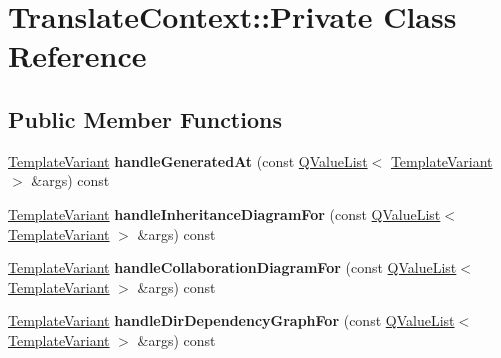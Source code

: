 \hypertarget{class_translate_context_1_1_private}{}\section{Translate\+Context\+::Private Class Reference}
\label{class_translate_context_1_1_private}
\subsection*{Public Member Functions}
\begin{DoxyCompactItemize}
\item 
\mbox{\label{class_translate_context_1_1_private_a4c2491bb58adb05eb7e8b21cfe10e8bc}} 
\mbox{\hyperlink{class_template_variant}{Template\+Variant}} {\bfseries handle\+Generated\+At} (const \mbox{\hyperlink{class_q_value_list}{Q\+Value\+List}}$<$ \mbox{\hyperlink{class_template_variant}{Template\+Variant}} $>$ \&args) const
\item 
\mbox{\label{class_translate_context_1_1_private_a7d13bd557b1e15a8d7444ad002c48625}} 
\mbox{\hyperlink{class_template_variant}{Template\+Variant}} {\bfseries handle\+Inheritance\+Diagram\+For} (const \mbox{\hyperlink{class_q_value_list}{Q\+Value\+List}}$<$ \mbox{\hyperlink{class_template_variant}{Template\+Variant}} $>$ \&args) const
\item 
\mbox{\label{class_translate_context_1_1_private_a0ff2da7fb5ded1dcc554248444b9d4ce}} 
\mbox{\hyperlink{class_template_variant}{Template\+Variant}} {\bfseries handle\+Collaboration\+Diagram\+For} (const \mbox{\hyperlink{class_q_value_list}{Q\+Value\+List}}$<$ \mbox{\hyperlink{class_template_variant}{Template\+Variant}} $>$ \&args) const
\item 
\mbox{\label{class_translate_context_1_1_private_a34829cbc688bdb5802b7cf8d5dd6a6f1}} 
\mbox{\hyperlink{class_template_variant}{Template\+Variant}} {\bfseries handle\+Dir\+Dependency\+Graph\+For} (const \mbox{\hyperlink{class_q_value_list}{Q\+Value\+List}}$<$ \mbox{\hyperlink{class_template_variant}{Template\+Variant}} $>$ \&args) const
\item 
\mbox{\label{class_translate_context_1_1_private_abd1f5a68fe5631d6e6a8becae199dc95}} 

\end{DoxyCompactItemize}
